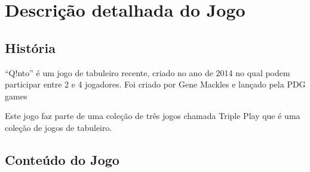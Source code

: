 \documentclass[a4paper]{article}
\begin{document}

\newpage

%
%
%
%
%
%
%


\section{Descrição detalhada do Jogo}
\subsection{História}

“Q!nto” é um jogo de tabuleiro recente, criado no ano de 2014 no qual podem participar entre 2 e 4 jogadores. Foi criado por Gene Mackles e lançado pela PDG games

Este jogo faz parte de uma coleção de três jogos chamada Triple Play que é uma coleção de jogos de tabuleiro.

\subsection{Conteúdo do Jogo}
\end{document}
